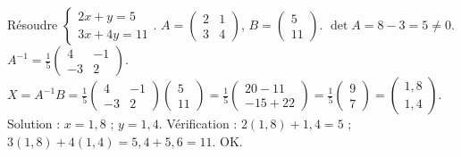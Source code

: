 \documentclass[11pt]{article}
\begin{document}
\begin{exoresolu}
Résoudre $\begin{cases} 2x + y = 5 \\ 3x + 4y = 11 \end{cases}$.
\tcblower
$A=\begin{pmatrix} 2 & 1 \\ 3 & 4 \end{pmatrix}$, $B=\begin{pmatrix} 5 \\ 11 \end{pmatrix}$.
$\det A = 8-3=5 \neq 0$.
$A^{-1} = \frac{1}{5}\begin{pmatrix} 4 & -1 \\ -3 & 2 \end{pmatrix}$.
$X = A^{-1}B = \frac{1}{5}\begin{pmatrix} 4 & -1 \\ -3 & 2 \end{pmatrix}\begin{pmatrix} 5 \\ 11 \end{pmatrix}
= \frac{1}{5}\begin{pmatrix} 20-11 \\ -15+22 \end{pmatrix} = \frac{1}{5}\begin{pmatrix} 9 \\ 7 \end{pmatrix} = \begin{pmatrix} 1,8 \\ 1,4 \end{pmatrix}$.
Solution : $x=1,8$ ; $y=1,4$. Vérification : $2(1,8)+1,4=5$ ; $3(1,8)+4(1,4)=5,4+5,6=11$. OK.
\end{exoresolu}
\end{document}
